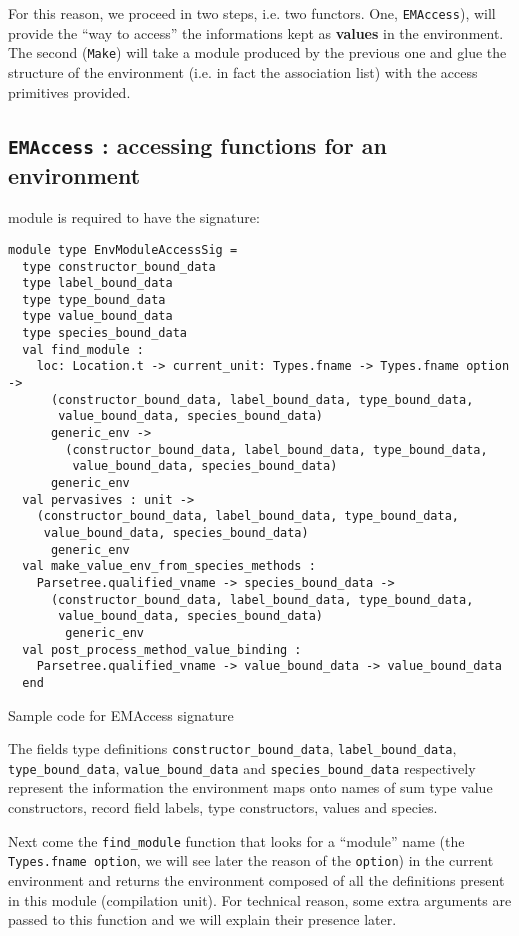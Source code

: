 \medskip
For this reason, we proceed in two steps, i.e. two functors. One,
{\tt EMAccess}), will provide the ``way to access'' the informations
kept as {\bf values} in the environment. The second ({\tt Make}) will
take a module produced by the previous one and glue the structure of
the environment (i.e. in fact the association list) with the access
primitives provided.

\subsection{{\tt EMAccess} : accessing functions for an environment}
module is required to have the signature:
{\scriptsize
\begin{lstlisting}[language=MyOCaml]
module type EnvModuleAccessSig =
  type constructor_bound_data
  type label_bound_data
  type type_bound_data
  type value_bound_data
  type species_bound_data
  val find_module :
    loc: Location.t -> current_unit: Types.fname -> Types.fname option ->
      (constructor_bound_data, label_bound_data, type_bound_data,
       value_bound_data, species_bound_data)
      generic_env ->
        (constructor_bound_data, label_bound_data, type_bound_data,
         value_bound_data, species_bound_data)
      generic_env
  val pervasives : unit ->
    (constructor_bound_data, label_bound_data, type_bound_data,
     value_bound_data, species_bound_data)
      generic_env
  val make_value_env_from_species_methods :
    Parsetree.qualified_vname -> species_bound_data ->
      (constructor_bound_data, label_bound_data, type_bound_data,
       value_bound_data, species_bound_data)
        generic_env
  val post_process_method_value_binding :
    Parsetree.qualified_vname -> value_bound_data -> value_bound_data
  end
\end{lstlisting}
}{\sc Sample code for EMAccess signature}

\medskip
The fields type definitions {\tt constructor\_bound\_data},
{\tt label\_bound\_data}, {\tt type\_bound\_data}, {\tt value\_bound\_data}
and {\tt species\_bound\_data} respectively represent the information the
environment maps onto names of sum type value constructors, record
field labels, type constructors, values and species.

\medskip
Next come the {\tt find\_module} function that looks for a ``module''
name (the {\tt Types.fname option}, we will see later the reason of
the {\tt option}) in the current environment and returns the
environment composed of all the definitions present in this module
(compilation unit). For technical reason, some extra arguments are
passed to this function and we will explain their presence later.

